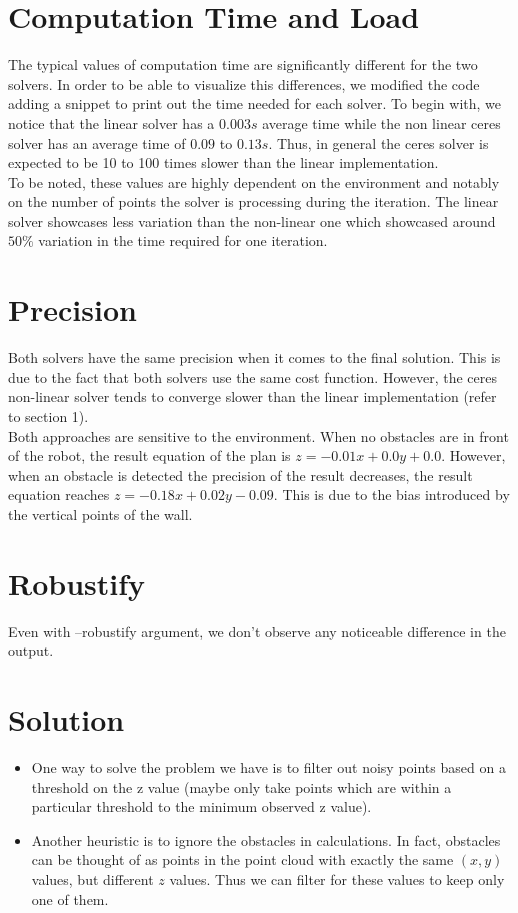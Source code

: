 \documentclass{article}
\begin{document}
\section{Computation Time and Load}
The typical values of computation time are significantly different for the two solvers. In order to be able to visualize this differences, we modified the code adding a snippet to print out the time needed for each solver. To begin with, we notice that the linear solver has a $0.003 s$ average time while the non linear ceres solver has an average time of $0.09 $ to ${0.13}s$. Thus, in  general the ceres solver is expected to be 10 to 100 times slower than the linear implementation. 
\\ \noindent To be noted, these values are highly dependent on the environment and notably on the number of points the solver is processing during the iteration. The linear solver showcases less variation than the non-linear one which showcased around $50\%$ variation in the time required for one iteration.
\section{Precision}
Both solvers have the same precision when it comes to the final solution. This is due to the fact that both solvers use the same cost function. However, the ceres non-linear solver tends to converge slower than the linear implementation (refer to section 1). 
\\ \noindent Both approaches are sensitive to the environment. When no obstacles are in front of the robot, the result equation of the plan is $z = -0.01 x + 0.0 y + 0.0$. However, when an obstacle is detected the precision of the result decreases, the result  equation reaches $z = -0.18x + 0.02y - 0.09$. This is due to the bias introduced by the vertical points of the wall. 
\section{Robustify}
Even with --robustify argument, we don't observe any noticeable difference in the output.
\section{Solution}
\begin{itemize}
    \item One way to solve the problem we have is to filter out noisy points based on a threshold on the z value (maybe only take points which are within a particular threshold to the minimum observed z value).
    \item Another heuristic is to ignore the obstacles in calculations. In fact, obstacles can be thought of as points in the point cloud with exactly the same $(x,y)$ values, but different $z$ values. Thus we can filter for these values to keep only one of them.
\end{itemize}
\end{document}
